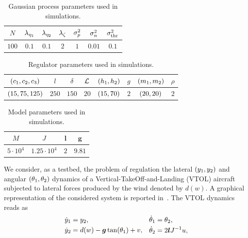 \begin{table}[b!]
	\centering
	\begin{tabular}{||c|c|c|c|c|c|c||}
		\hline
		\hline
		$N$ & $\lambda_{\eta_1}$ &  $\lambda_{\eta_2}$ & $\lambda_{\zeta}$ & $\sigma_p^2$ & $\sigma_n^2$ & $\sigma^2_{\text{thr}}$ \\
		\hline
		$100$ & $0.1$ & $0.1$ & $2$ & $1$ & $0.01$ & $0.1$\\
		\hline
		\hline
	\end{tabular}
	\caption{Gaussian process parameters used in simulations.}%
	\label{TAB:POSTP-GP-SIMULATION-PARAMETERS}
\end{table}
\begin{table}[b!]
	\centering
	\begin{tabular}{||c|c|c|c|c|c|c|c||}
		\hline
		\hline
		$\left( c_1, c_2, c_3\right)$ & $l$ & $\delta$ & $\mathcal{L}$  & $\left( h_1, h_2\right)$ & $g$ & $\left( m_1, m_2\right)$ & $\rho$ \\
		\hline
		$\left( 15, 75, 125\right)$ & $250$ & $150$ & $20$ & $\left( 15, 70\right)$ & $2$ & $\left( 20, 20\right)$ & $2$ \\
		\hline
		\hline
	\end{tabular}
	\caption{Regulator parameters used in simulations.}%
	\label{TAB:POSTP-REGULATOR-SIMULATION-PARAMETERS}
\end{table}
\begin{table}[b!]
	\centering
	\begin{tabular}{||c|c|c|c||}
		\hline
		\hline
		$M$ & $J$ & $\boldsymbol{l}$ & $\boldsymbol{g}$ \\
		\hline
		$5\cdot 10^4$ & $1.25 \cdot 10^4$ & $2$ & $9.81$ \\
		\hline
		\hline
	\end{tabular}
	\caption{Model parameters used in simulations.}%
	\label{TAB:POSTP-MODEL-SIMULATION-PARAMETERS}
\end{table}
We consider, as a testbed, the problem of regulation the lateral $\left( y_1, y_2 \right)$ and angular $\left( \theta_1, \theta_2 \right)$
dynamics of a Vertical-TakeOff-and-Landing (VTOL) aircraft~\cite{isidori2003robust} subjected to lateral forces
produced by the wind denoted by $d(w)$. A graphical representation of the considered system is reported in~.
The VTOL dynamics reads as
\begin{equation}%
   \label{EQ:OR-POSTP-VTOL-DYNAMICS}
   \begin{matrix}
      \begin{split}
        \dot{y}_1 & = y_2,  \\ \dot{y}_2 & = d(\ww) - \boldsymbol{g} \tan(\theta_1) + v,
      \end{split} & 
      \begin{split}
        \dot{\theta}_1 & = \theta_2, \\ \dot{\theta}_2 & = 2\boldsymbol{l}J^{-1}\uu,
      \end{split}
   \end{matrix}
\end{equation}
